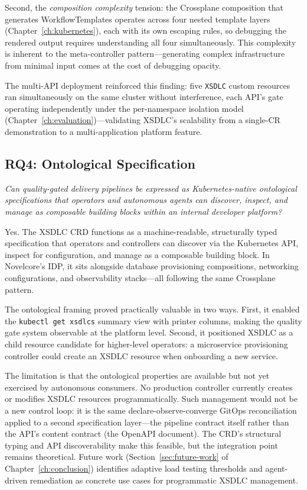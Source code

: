 Second, the \textit{composition complexity} tension: the Crossplane composition that generates WorkflowTemplates operates across four nested template layers (Chapter~\ref{ch:kubernetes}), each with its own escaping rules, so debugging the rendered output requires understanding all four simultaneously. This complexity is inherent to the meta-controller pattern---generating complex infrastructure from minimal input comes at the cost of debugging opacity.

The multi-API deployment reinforced this finding: five \texttt{XSDLC} custom resources ran simultaneously on the same cluster without interference, each API's gate operating independently under the per-namespace isolation model (Chapter~\ref{ch:evaluation})---validating XSDLC's scalability from a single-CR demonstration to a multi-application platform feature.

\subsection{RQ4: Ontological Specification}
\label{subsec:discuss-rq4}

\textit{Can quality-gated delivery pipelines be expressed as Kubernetes-native ontological specifications that operators and autonomous agents can discover, inspect, and manage as composable building blocks within an internal developer platform?}

Yes. The XSDLC CRD functions as a machine-readable, structurally typed specification that operators and controllers can discover via the Kubernetes API, inspect for configuration, and manage as a composable building block. In Novelcore's IDP, it sits alongside database provisioning compositions, networking configurations, and observability stacks---all following the same Crossplane pattern.

The ontological framing proved practically valuable in two ways. First, it enabled the \texttt{kubectl get xsdlcs} summary view with printer columns, making the quality gate system observable at the platform level. Second, it positioned XSDLC as a child resource candidate for higher-level operators: a microservice provisioning controller could create an XSDLC resource when onboarding a new service.

The limitation is that the ontological properties are available but not yet exercised by autonomous consumers. No production controller currently creates or modifies XSDLC resources programmatically. Such management would not be a new control loop: it is the same declare-observe-converge GitOps reconciliation applied to a second specification layer---the pipeline contract itself rather than the API's content contract (the OpenAPI document). The CRD's structural typing and API discoverability make this feasible, but the integration point remains theoretical. Future work (Section~\ref{sec:future-work} of Chapter~\ref{ch:conclusion}) identifies adaptive load testing thresholds and agent-driven remediation as concrete use cases for programmatic XSDLC management.

